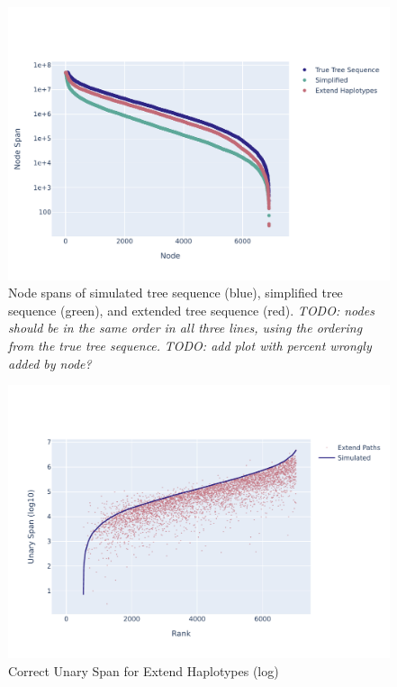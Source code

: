 \documentclass[10pt,twoside,lineno]{gsajnl}
\newcommand{\comment}[1]{{\color{violet} \it #1}}
\begin{document}
\begin{figure}[bht]
	\includegraphics[width=0.9\linewidth]{newplots_wo_ee/node_spans_wo_trapped_unary_regions.pdf}
	\caption{
        Node spans of simulated tree sequence (blue), simplified tree sequence (green), and extended tree sequence (red).
        \comment{TODO: nodes should be in the same order in all three lines,
        using the ordering from the true tree sequence.}
        \comment{TODO: add plot with percent wrongly added by node?}
    }
	\label{fig:node-spans}
\end{figure}

\begin{figure}[bht]
	\includegraphics[width=0.9\linewidth]{newplots_wo_ee/better_unary_spans_ep_log.pdf}
	\caption{Correct Unary Span for Extend Haplotypes (log)}
	\label{fig:correct-unary-span-log}
\end{figure}
\end{document}
